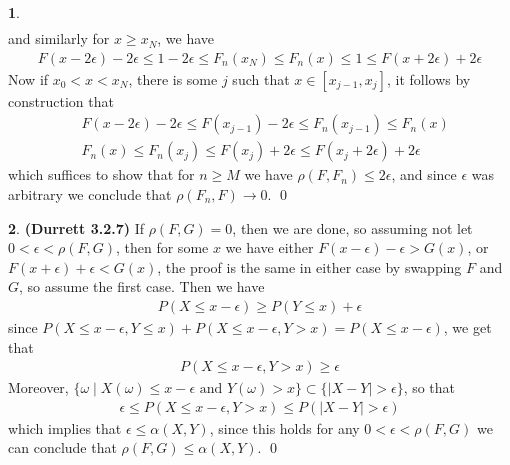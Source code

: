 \documentclass[10.5pt]{article}
\theoremstyle{definition}
\newtheorem{pb}{}
\newcommand{\set}[1]{\{#1\}}
\newcommand{\abs}[1]{\lvert#1\rvert}
\newcommand{\tand}{\text{ and }}
\begin{document}
\begin{pb}
\begin{align*}
        \end{align*}
        and similarly for \(x \geq x_N\), we have 
        \begin{align*}
            F(x - 2 \epsilon) - 2 \epsilon  \leq 1 - 2 \epsilon \leq F_n(x_N) \leq F_n(x) \leq 1 \leq F(x + 2 \epsilon) + 2 \epsilon
        \end{align*}
        Now if \(x_0 < x < x_N\), there is some \(j\) such that \(x \in [x_{j-1},x_j]\), it follows by construction that
        \begin{align*}
            &F(x - 2\epsilon) - 2 \epsilon \leq F(x_{j-1}) - 2 \epsilon \leq F_n(x_{j-1}) \leq F_n(x) \\
            &F_n(x) \leq F_n(x_j) \leq F(x_j) + 2 \epsilon \leq F(x_j + 2 \epsilon) + 2 \epsilon
        \end{align*}
        which suffices to show that for \(n \geq M\) we have \(\rho(F,F_n) \leq 2 \epsilon\), and since \(\epsilon\) was arbitrary we conclude that \(\rho(F_n,F) \to 0\). \qed
    \end{pb}
    \begin{pb}\textbf{(Durrett 3.2.7)}
        If \(\rho(F,G) = 0\), then we are done, so assuming not let \(0 < \epsilon < \rho(F,G)\), then for some \(x\) we have either \(F(x - \epsilon) - \epsilon > G(x)\), or \(F(x + \epsilon) + \epsilon < G(x)\), the proof is the same in either case by swapping \(F\) and \(G\), so assume the first case. Then we have
        \begin{align*}
            P(X \leq x - \epsilon) \geq P(Y \leq x) + \epsilon
        \end{align*}
        since \(P(X \leq x - \epsilon, Y \leq x) + P(X \leq x - \epsilon, Y > x) = P(X \leq x - \epsilon)\), we get that
        \begin{align*}
            P(X \leq x - \epsilon, Y > x) \geq \epsilon
        \end{align*}
        Moreover, \(\set{\omega \mid X(\omega) \leq x - \epsilon \tand Y(\omega) > x} \subset \set{\abs{X - Y} > \epsilon}\), so that
        \begin{align*}
            \epsilon \leq P(X \leq x - \epsilon, Y > x) \leq P(\abs{X - Y} > \epsilon)
        \end{align*}
        which implies that \(\epsilon \leq \alpha(X,Y)\), since this holds for any \(0 < \epsilon < \rho(F,G)\) we can conclude that \(\rho(F,G) \leq \alpha(X,Y)\). \qed
    \end{pb}
\end{document}
